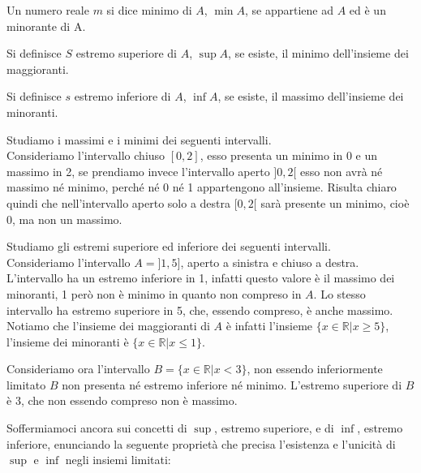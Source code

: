 \begin{definizione}
  Un numero reale \(m\) si dice minimo di \(A\), \(\min{A}\), se appartiene 
ad \(A\) ed è un minorante di A.
\end{definizione}

\begin{definizione}
  Si definisce \(S\) estremo superiore di \(A\), \(\sup{A}\), se esiste, il 
minimo dell'insieme dei maggioranti.
\end{definizione}

\begin{definizione}
  Si definisce \(s\) estremo inferiore di \(A\), \(\inf{A}\), se esiste, il 
massimo dell'insieme dei minoranti.
\end{definizione}

\begin{esempio}Studiamo i massimi e i minimi dei seguenti intervalli.\\
Consideriamo l'intervallo chiuso \([0,2]\), esso presenta un minimo in 0 e un 
massimo in 2, se prendiamo invece l'intervallo aperto \(]0,2[\) esso non avrà 
né massimo né minimo, perché né 0 né 1 appartengono all'insieme. Risulta 
chiaro quindi che nell'intervallo aperto solo a destra \([0,2[\) sarà presente 
un minimo, cioè 0, ma non un massimo.
\end{esempio}

\begin{esempio}Studiamo gli estremi superiore ed inferiore dei seguenti 
intervalli.\\
Consideriamo l'intervallo \(A=]1, 5]\), aperto a sinistra e chiuso a destra. 
L'intervallo ha un estremo inferiore in 1, infatti questo valore è il massimo 
dei minoranti, 1 però non è minimo in quanto non compreso in \(A\). Lo stesso 
intervallo ha estremo superiore in 5, che, essendo compreso, è anche massimo. 
Notiamo che l'insieme dei maggioranti di \(A\) è infatti l'insieme 
\(\{x\in\mathbb{R}\vert x\geq5\}\), l'insieme dei minoranti è 
\(\{x\in\mathbb{R}\vert x\leq1\}\).

Consideriamo ora l'intervallo \(B=\{x\in\mathbb{R}\vert x<3\}\), non essendo 
inferiormente limitato \(B\) non presenta né estremo inferiore né minimo. 
L'estremo superiore di \(B\) è 3, che non essendo compreso non è massimo.
\end{esempio}

Soffermiamoci ancora sui concetti di \(\sup\), estremo superiore, e 
di \(\inf\), 
estremo inferiore, enunciando la seguente proprietà che precisa l'esistenza e 
l'unicità di \(\sup\) e \(\inf\) negli insiemi limitati:


